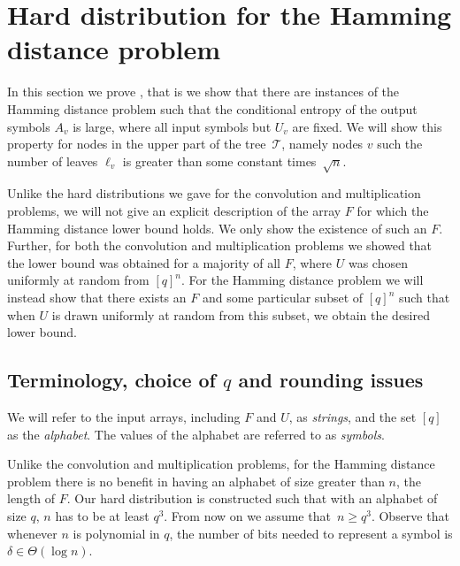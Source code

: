 \documentclass{toc}
\newcommand{\calT}{\ensuremath{\mathcal{T}}}
\newcommand{\Xv}{\ensuremath{U_v}}
\newcommand{\Yv}{\ensuremath{A_v}}
\begin{document}
%
%
%
%
%
%
%
%
%
%



%



%




\section{Hard distribution for the Hamming distance problem} \label{sec:ham}

In this section we prove , that is we show that there are instances of the Hamming distance problem such that the conditional entropy of the output symbols $\Yv$ is large, where all input symbols but $\Xv$ are fixed.
We will show this property for nodes in the upper part of the tree~$\calT$, namely nodes $v$ such the number of leaves $\ell_v$ is greater than some constant times~$\sqrt{n}$. 

Unlike the hard distributions we gave for the convolution and multiplication problems, we will not give an explicit description of the array $F$ for which the Hamming distance lower bound holds. We only show the existence of such an $F$.
Further, for both the convolution and multiplication problems we showed that the lower bound was obtained for a majority of all $F$, where $U$ was chosen uniformly at random from $[q]^n$.
For the Hamming distance problem we will instead show that there exists an $F$ and some particular subset of $[q]^n$ such that when $U$ is drawn uniformly at random from this subset, we obtain the desired lower bound.

\subsection{Terminology, choice of \texorpdfstring{$q$}{q} and rounding issues} \label{sec:rounding}

We will refer to the input arrays, including $F$ and $U$, as \emph{strings}, and the set $[q]$ as the \emph{alphabet}. The values of the alphabet are referred to as \emph{symbols}.

Unlike the convolution and multiplication problems, for the Hamming distance problem there is no benefit in having an alphabet
of    %
size greater
than  %
$n$, the length of $F$.
Our hard distribution is constructed such that with an alphabet of size $q$, $n$ has to be at least $q^3$.
{}From now on we assume that~$n\geq q^3$.
Observe that whenever $n$ is polynomial in $q$, the number of bits needed to represent a symbol is $\delta\in\Theta(\log n)$.
\end{document}
